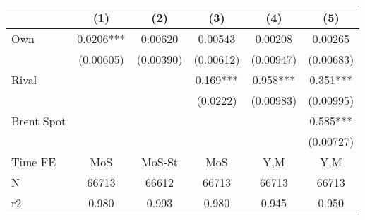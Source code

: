{
\def\sym#1{\ifmmode^{#1}\else\(^{#1}\)\fi}
\begin{tabular}{l*{5}{c}}
\toprule
                &\multicolumn{1}{c}{(1)}   &\multicolumn{1}{c}{(2)}   &\multicolumn{1}{c}{(3)}   &\multicolumn{1}{c}{(4)}   &\multicolumn{1}{c}{(5)}   \\
\midrule
Own             &   0.0206***&  0.00620   &  0.00543   &  0.00208   &  0.00265   \\
                &(0.00605)   &(0.00390)   &(0.00612)   &(0.00947)   &(0.00683)   \\
\addlinespace
Rival           &            &            &    0.169***&    0.958***&    0.351***\\
                &            &            & (0.0222)   &(0.00983)   &(0.00995)   \\
\addlinespace
Brent Spot      &            &            &            &            &    0.585***\\
                &            &            &            &            &(0.00727)   \\
\midrule
Time FE         &      MoS   &   MoS-St   &      MoS   &      Y,M   &      Y,M   \\
N               &    66713   &    66612   &    66713   &    66713   &    66713   \\
r2              &    0.980   &    0.993   &    0.980   &    0.945   &    0.950   \\
\bottomrule
\end{tabular}
}
